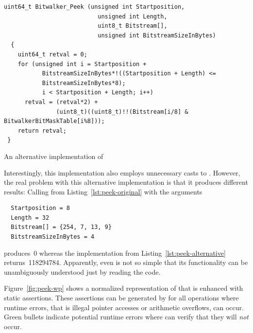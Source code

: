 \begin{listing}[hbt]
\begin{minipage}{\textwidth}
\begin{lstlisting}[style=acsl-block,frame=single]
  uint64_t Bitwalker_Peek (unsigned int Startposition,
                           unsigned int Length,
                           uint8_t Bitstream[],
                           unsigned int BitstreamSizeInBytes)
  {
    uint64_t retval = 0;
    for (unsigned int i = Startposition +
           BitstreamSizeInBytes*!((Startposition + Length) <=
           BitstreamSizeInBytes*8);
           i < Startposition + Length; i++)
      retval = (retval*2) +
               (uint8_t)((uint8_t)!!(Bitstream[i/8] & BitwalkerBitMaskTable[i%8]));
    return retval;
 }
\end{lstlisting}
\end{minipage}
\caption{\label{lst:peek-alternative} An alternative implementation of \peek}
\end{listing}

Interestingly, this implementation also employs unnecessary casts to .
However, the real problem with this alternative implementation is that it produces
different results: Calling \peek from Listing~\ref{lst:peek-original} with the arguments

\begin{verbatim}
  Startposition = 8
  Length = 32
  Bitstream[] = {254, 7, 13, 9}
  BitstreamSizeInBytes = 4
\end{verbatim}

produces~0 whereas the implementation from Listing~\ref{lst:peek-alternative} returns~118294784.
Apparently, even \peek is not so simple that its functionality can be unambiguously
understood just by reading the code.


\clearpage

Figure~\ref{fig:peek-wp} shows a normalized representation of \peek
that is enhanced with static \acsl assertions.
These assertions can be generated by \framac for all operations where
runtime errors, that is illegal pointer accesses or arithmetic overflows, can occur.
Green bullets indicate potential runtime errors where \framacwp can verify
that they will \emph{not} occur.


